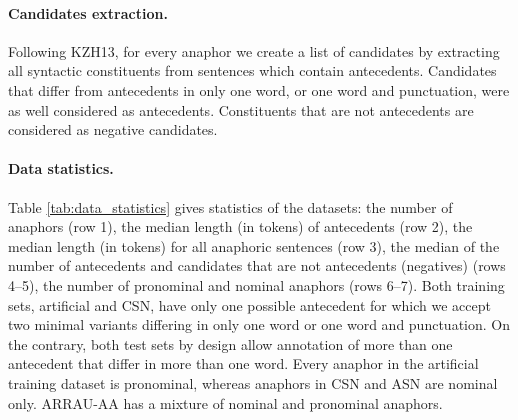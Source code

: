 \documentclass[11pt,letterpaper]{article}
\begin{document}
\paragraph{Candidates extraction.} Following KZH13, for every anaphor we create a list of candidates by extracting all syntactic constituents from sentences which contain antecedents. Candidates that differ from antecedents in only one word, or one word and punctuation, were as well considered as antecedents. Constituents that are not antecedents are considered as negative candidates. 


\paragraph{Data statistics.} 
Table \ref{tab:data_statistics} gives statistics of the datasets: the number of anaphors (row 1), the median length (in tokens) of antecedents (row 2), the median length (in tokens) for all anaphoric sentences (row 3), the median of the number of antecedents and candidates that are not antecedents (negatives) (rows 4--5), the number of pronominal and nominal anaphors (rows 6--7). Both training sets, artificial and CSN, have only one possible antecedent for which we accept two minimal variants differing in only one word or one word and punctuation.
On the contrary, both test sets by design allow annotation of more than one antecedent that differ in more than one word. Every anaphor in the artificial training dataset is pronominal, whereas anaphors in CSN and ASN are nominal only. ARRAU-AA has a mixture of nominal and pronominal anaphors.
\end{document}

